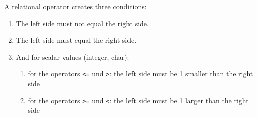 A relational operator creates three conditions:

\begin{enumerate}

\item The left side must not equal the right side.

\item The left side must equal the right side.

\item And for scalar values (integer, char):
        \begin{enumerate}
                \item for the operators {\tt <=} und {\tt >}:
                       the left side must be 1 smaller than the right side
                \item for the operators {\tt >=} und {\tt <}:
                       the left side must be 1 larger than the right side
        \end{enumerate}
\end{enumerate}
